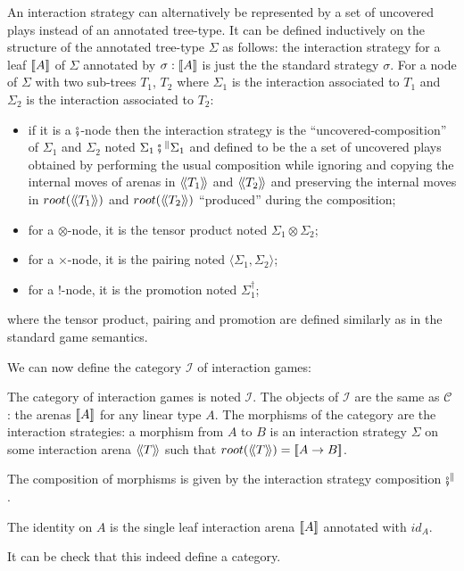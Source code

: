 An interaction strategy can alternatively be represented by a set of
uncovered plays instead of an annotated tree-type.
It can be defined inductively on the structure of the annotated tree-type $\Sigma$ as follows:
the interaction strategy for a leaf ${[\![ A ]\!]}$ of
$\Sigma$ annotated by $\sigma :{[\![ A ]\!]}$ is just the the standard strategy $\sigma$.
For a node of $\Sigma$ with two sub-trees $T_1$, $T_2$ where $\Sigma_1$ is the interaction associated to $T_1$
and $\Sigma_2$ is the interaction associated to $T_2$:
\begin{itemize}
\item if it is a $\fatsemi$-node then the interaction strategy is the
``uncovered-composition'' of $\Sigma_1$ and $\Sigma_2$ noted $\Sigma_1
\fatsemi{^\|} \Sigma_1$ and defined to be the a set of uncovered plays
obtained by performing the usual composition while ignoring and
copying the internal moves of arenas in ${\langle\!\langle T_1 \rangle\!\rangle}$ and ${\langle\!\langle T_2 \rangle\!\rangle}$
and preserving the internal moves in $root({\langle\!\langle T_1 \rangle\!\rangle})$ and $root({\langle\!\langle T_2 \rangle\!\rangle})$
``produced'' during the composition;

\item for a $\otimes$-node, it is the tensor product noted $\Sigma_1 \otimes \Sigma_2$;
\item for a $\times$-node, it is the pairing noted $\langle \Sigma_1, \Sigma_2 \rangle$;
\item for a $!$-node, it is the promotion noted $\Sigma_1^\dagger$;
\end{itemize}
where the tensor product, pairing and promotion are defined similarly as in the standard game semantics.


We can now define the category $\mathcal{I}$ of interaction games:
\begin{dfn}
The category of interaction games is noted $\mathcal{I}$. The
objects of $\mathcal{I}$ are the same as $\mathcal{C}$ : the arenas ${[\![ A ]\!]}$ for any linear type $A$. The morphisms of
the category are the interaction strategies: a morphism from $A$
to $B$ is an interaction strategy $\Sigma$ on some interaction arena
${\langle\!\langle T \rangle\!\rangle}$ such that $root({\langle\!\langle T \rangle\!\rangle}) = {[\![ A\rightarrow B ]\!]}$.

The composition of morphisms is given by the interaction strategy
composition $\fatsemi{^\|}$.

The identity on $A$ is the single leaf interaction arena ${[\![ A ]\!]}$ annotated with $id_A$.
\end{dfn}

It can be check that this indeed define a category.

